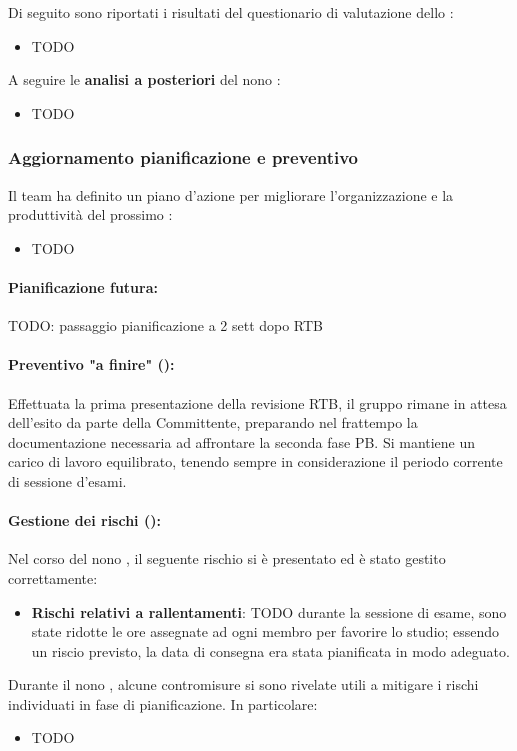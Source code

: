 \par Di seguito sono riportati i risultati del questionario di valutazione dello :
\begin{itemize}
  \item TODO
\end{itemize}

\vspace{0.5\baselineskip}
\par A seguire le \textbf{analisi a posteriori} del nono :
\begin{itemize}
  \item TODO
\end{itemize}

\subsubsection{Aggiornamento pianificazione e preventivo}
\par Il team ha definito un piano d'azione per migliorare l'organizzazione e la produttività del prossimo :
\begin{itemize}
  \item TODO
\end{itemize}

\paragraph*{Pianificazione futura:}
\par TODO: passaggio pianificazione a 2 sett dopo RTB

\paragraph*{Preventivo "a finire" ():}
\par Effettuata la prima presentazione della revisione RTB, il gruppo rimane in attesa dell'esito da parte della Committente, preparando nel frattempo la documentazione necessaria ad affrontare la seconda fase PB. Si mantiene un carico di lavoro equilibrato, tenendo sempre in considerazione il periodo corrente di sessione d'esami.

\paragraph*{Gestione dei rischi ():}
\par Nel corso del nono , il seguente rischio si è presentato ed è stato gestito correttamente:
\begin{itemize}
  \item \textbf{Rischi relativi a rallentamenti}: TODO durante la sessione di esame, sono state ridotte le ore assegnate ad ogni membro per favorire lo studio; essendo un riscio previsto, la data di consegna era stata pianificata in modo adeguato.
\end{itemize}

\vspace{0.5\baselineskip}
\par Durante il nono , alcune contromisure si sono rivelate utili a mitigare i rischi individuati in fase di pianificazione. In particolare:
\begin{itemize}
  \item TODO
\end{itemize}
